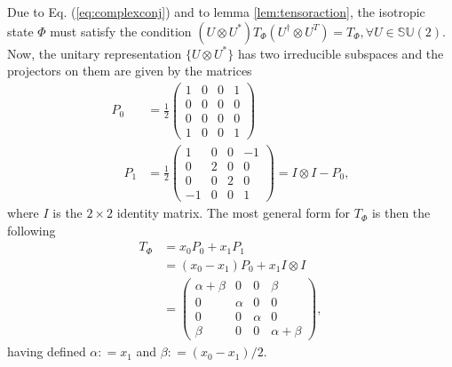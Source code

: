 \documentclass[12pt,aps,pra,showpacs,groupedaddress]{revtex4-1}
\begin{document}
Due to Eq. (\ref{eq:complexconj}) and to lemma \ref{lem:tensoraction},  the isotropic state $\Phi$ must satisfy the condition
$(U\otimes U^*) T_\Phi (U^\dag\otimes U^T)=T_\Phi, \forall U \in \mathbb{SU} (2)$. Now, the unitary representation $\{U \otimes
U^*\}$ has two irreducible subspaces and the projectors on them are given by the matrices
\begin{align*}
  P_0&=\frac12
  \begin{pmatrix}
    1&0&0&1\\
    0&0&0&0\\
    0&0&0&0\\
    1&0&0&1
  \end{pmatrix}\\
\quad P_1&=\frac12
  \begin{pmatrix}
    1&0&0&-1\\
    0&2&0&0\\
    0&0&2&0\\
    -1&0&0&1
  \end{pmatrix} =  I \otimes I - P_0,
\end{align*}
where $I$ is the $2\times 2$ identity matrix.
The most general form for $T_\Phi$ is then the following
\begin{align*}
  T_\Phi &=  x_0  P_0  +  x_1  P_1 \\
    & =  (x_0 - x_1)   P_0  + x_1  I \otimes I\\ 
  &=\begin{pmatrix}
    \alpha+\beta&0&0&\beta\\
    0&\alpha&0&0\\
    0&0&\alpha&0\\
    \beta&0&0&\alpha+\beta
  \end{pmatrix},
\end{align*}
having defined $\alpha: = x_1 $ and $\beta: =(x_0-x_1)/2$.  
\end{document}
